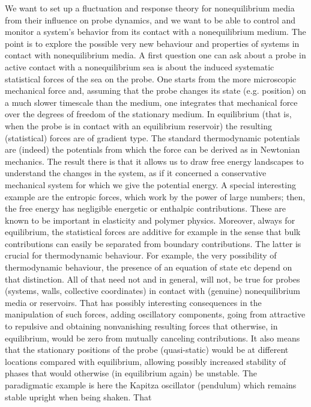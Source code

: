 We want to set up a fluctuation and response theory for nonequilibrium media
from their influence on probe dynamics, and we want to be able to control and monitor a
system’s behavior from its contact with a nonequilibrium medium. The point is to explore the
possible very new behaviour and properties of systems in contact with nonequilibrium
media. A first question one can ask about a probe in active contact with a nonequilibrium
sea is about the induced systematic statistical forces of the sea on the probe.  One starts
from the more microscopic mechanical force and, assuming that the probe changes its state
(e.g. position) on a much slower timescale than the medium, one integrates that mechanical
force over the degrees of freedom of the stationary medium.  In equilibrium (that is, when
the probe is in contact with an equilibrium reservoir) the resulting (statistical) forces
are of gradient type.  The standard thermodynamic potentials are (indeed) the potentials
from which the force can be derived as in Newtonian mechanics. The result there is that it
allows us to draw free energy landscapes to understand the changes in the system, as if it
concerned a conservative mechanical system for which we give the potential energy.  A
special interesting example are the entropic forces, which work by the power of large
numbers; then, the free energy has negligible energetic or enthalpic contributions.  These
are known to be important in elasticity and polymer physics. Moreover, always for
equilibrium, the statistical forces are additive for example in the sense that bulk
contributions can easily be separated from boundary contributions.  The latter is crucial
for thermodynamic behaviour.  For example, the very possibility of thermodynamic behaviour,
the presence of an equation of state etc depend on that distinction.  All of that need not
and in general, will not,
be true for probes (systems, walls, collective coordinates) in contact with (genuine)
nonequilibrium media or reservoirs. That has possibly
interesting consequences in the manipulation of such forces, adding oscillatory components,
going from attractive to repulsive and obtaining nonvanishing resulting forces that
otherwise, in equilibrium, would be zero from mutually canceling contributions.
%
It also means that the stationary positions of the probe (quasi-static) would be at
different locations compared with equilibrium, allowing possibly increased stability of
phases that would otherwise (in equilibrium again) be unstable.  The paradigmatic example is
here the Kapitza oscillator (pendulum) which remains stable upright when being shaken.  That
